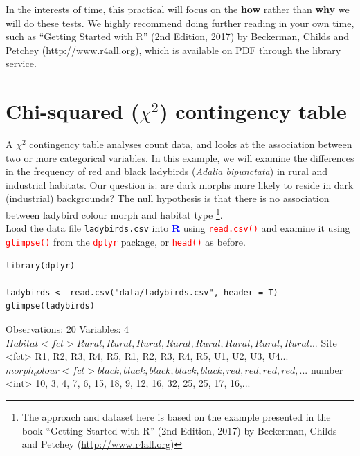 \documentclass[a4paper,12pt]{article}
\newcommand\boldblue[1]{\textcolor{blue}{\textbf{#1}}}
\newcommand\code[1]{\textcolor{red}{\texttt{#1}}}
\begin{document}
In the interests of time, this practical will focus on the \textbf{how} rather than \textbf{why} we will do these tests. We highly recommend doing further reading in your own time, such as ``Getting Started with R'' (2nd Edition, 2017) by Beckerman, Childs and Petchey (\url{http://www.r4all.org}), which is available on PDF through the library service.



\section{Chi-squared ($\chi^{2}$) contingency table}

A $\chi ^{2}$ contingency table analyses count data, and looks at the association between two or more categorical variables. In this example, we will examine the differences in the frequency of red and black ladybirds (\textit{Adalia bipunctata}) in rural and industrial habitats. Our question is: are dark morphs more likely to reside in dark (industrial) backgrounds? The null hypothesis is that there is no association between ladybird colour morph and habitat type \footnote{The approach and dataset here is based on the example presented in the book ``Getting Started with R'' (2nd Edition, 2017) by Beckerman, Childs and Petchey (\url{http://www.r4all.org})}. \\

Load the data file \texttt{ladybirds.csv} into \boldblue{R} using \code{read.csv()} and examine it using \code{glimpse()} from the \code{dplyr} package, or \code{head()} as before.

\begin{shaded}
\begin{verbatim}
library(dplyr)

ladybirds <- read.csv("data/ladybirds.csv", header = T)
glimpse(ladybirds)
\end{verbatim}
\begin{Schunk}
\begin{Soutput}
Observations: 20
Variables: 4
$ Habitat      <fct> Rural, Rural, Rural, Rural, Rural, Rural, Rural, Rural...
$ Site         <fct> R1, R2, R3, R4, R5, R1, R2, R3, R4, R5, U1, U2, U3, U4...
$ morph_colour <fct> black, black, black, black, black, red, red, red, red,...
$ number       <int> 10, 3, 4, 7, 6, 15, 18, 9, 12, 16, 32, 25, 25, 17, 16,...
\end{Soutput}
\end{Schunk}
\end{shaded}
\end{document}
